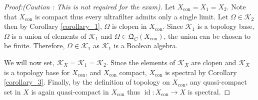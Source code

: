 \documentclass[8pt]{article}
\numberwithin{equation}{section}
\DeclareMathOperator{\id}{id}
\DeclareMathOperator{\con}{con}
\newcommand{\K}[0]{\mathcal{K}}
\newcommand{\QC}[0]{\mathfrak{Q}_C}
\begin{document}
\begin{proof}[Proof:(Caution : This is not required for the exam)]
\par Let $X_{\con}=X_1=X_2$. Note that $X_{\con}$ is compact thus every ultrafilter admits only a single limit. Let $\Omega\in\K_2$ then by Corollary \ref{corollary_1}, $\Omega$ is clopen in $X_{\con}$. Since $\K_1$ is a topology base, $\Omega$ is a union of elements of $\K_1$ and $\Omega\in\QC(X_{\con})$, the union can be chosen to be finite. Therefore, $\Omega\in\K_1$ as $\K_1$ is a Boolean algebra.
\par We will now set, $\K_X=\K_1=\K_2$. Since the elements of $\K_X$ are clopen and $\K_X$ is a topology base for $X_{\con}$, and $X_{\con}$ compact, $X_{\con}$ is spectral by Corollary \ref{corollary_3}. Finally, by the definition of topology on $X_{\con}$, any quasi-compact set in $X$ is again quasi-compact in $X_{\con}$ thus $\id:X_{\con}\to X$ is spectral.
\end{proof}
\end{document}
